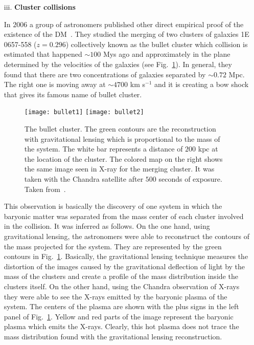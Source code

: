\begin{itemize}
\item[iii.] \textbf{Cluster collisions}

In $2006$ a group of astronomers published other direct empirical proof of the existence of the DM~\cite{Clowe:2006eq}. They studied the merging of two clusters of galaxies 1E 0657-558 ($z=0.296$) collectively known as the bullet cluster which collision is estimated that happened $\sim 100$ Mys ago and approximately in the plane determined by the velocities of the galaxies (see Fig.~\ref{fig:bullet}). 
%
In general, they found that there are two concentrations of galaxies separated by $\sim 0.72$ Mpc. The right one is moving away at $\sim 4700$ km s$^{-1}$ and it is creating a bow shock that gives its famous name of bullet cluster. 
%
\begin{figure}[h]
\centering
\texttt{[image: bullet1]}
\texttt{[image: bullet2]}
\caption{The bullet cluster. The green contours are the reconstruction with gravitational lensing which is proportional to the mass of the system. The white bar represents a distance of $200$ kpc at the location of the cluster. The colored map on the right shows the same image seen in X-ray for the merging cluster. It was taken with the Chandra satellite after $500$ seconds of exposure. Taken from~\cite{Clowe:2006eq}.}
\label{fig:bullet}
\end{figure}
%

This observation is basically the discovery of one system in which the baryonic matter was separated from the mass center of each cluster involved in the collision. It was inferred as follows.
%
On the one hand, using gravitational lensing, the astronomers were able to reconstruct the contours of the mass projected for the system. They are represented by the green contours in Fig.~\ref{fig:bullet}. 
Basically, the gravitational lensing technique measures the distortion of the images caused by the gravitational deflection of light by the mass of the clusters and create a profile of the mass distribution inside the clusters itself. 
%
On the other hand, using the Chandra observation of X-rays they were able to see the X-rays emitted by the baryonic plasma of the system. The centers of the plasma are shown with the plus signs in the left panel of Fig.~\ref{fig:bullet}. Yellow and red parts of the image represent the baryonic plasma which emits the X-rays. Clearly, this hot plasma does not trace the mass distribution found with the gravitational lensing reconstruction. 


\end{itemize}

